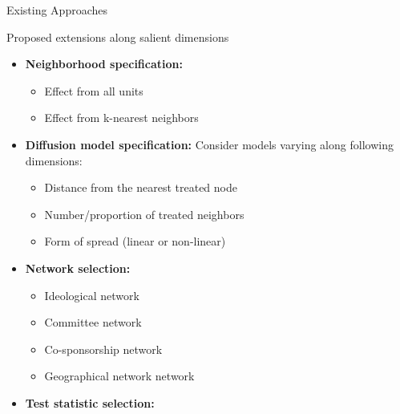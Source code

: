 \documentclass[final]{beamer}
\newlength{\onecolwid}
\newlength{\onecolwidd}
\begin{document}
\begin{frame}[t]
\begin{columns}[t]
\begin{column}{\onecolwidd}
\begin{block}{Existing Approaches}
\begin{rmfamily}
	\end{rmfamily}
	\end{block}
	
	\hspace{2cm}
						
	\vspace*{10mm}
	\begin{block}{Proposed extensions along salient dimensions}
	\begin{rmfamily}
	
	\begin{itemize}
	
	\item \textbf{Neighborhood specification:}
		\begin{multicols}{2}
		\begin{itemize}
		\item Effect from all units
		\item Effect from k-nearest neighbors 
		\end{itemize}
		\end{multicols}
		\vspace*{.02in}
	\item \textbf{Diffusion model specification:} Consider models varying along following dimensions:
		\begin{multicols}{2}
		\begin{itemize}
		\item Distance from the nearest treated node
		\item Number/proportion of treated neighbors
		\item Form of spread (linear or non-linear)
		\end{itemize}
		\end{multicols}
		\vspace*{.02in}
	\item \textbf{Network selection:}
		\begin{multicols}{2}
		\begin{itemize}
		\item Ideological network
		\item Committee network
		\item Co-sponsorship network
		\item Geographical network network
		\end{itemize}
		\end{multicols}
		\vspace*{.02in}	
	\item \textbf{Test statistic selection:}
		\begin{multicols}{2}

\end{multicols}
\end{itemize}
\end{rmfamily}
\end{block}
\end{column}
\end{columns}
\end{frame}
\end{document}
